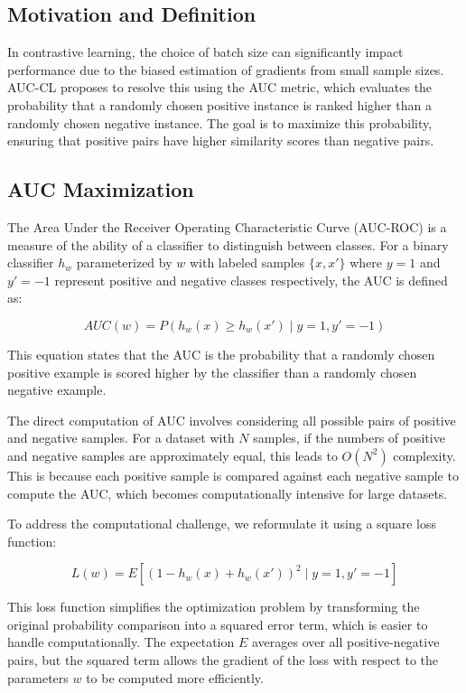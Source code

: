 \subsection{Motivation and Definition}
In contrastive learning, the choice of batch size can significantly impact performance due to the biased estimation of gradients from small sample sizes. AUC-CL proposes to resolve this using the AUC metric, which evaluates the probability that a randomly chosen positive instance is ranked higher than a randomly chosen negative instance. The goal is to maximize this probability, ensuring that positive pairs have higher similarity scores than negative pairs.

\subsection{AUC Maximization}
The Area Under the Receiver Operating Characteristic Curve (AUC-ROC) is a measure of the ability of a classifier to distinguish between classes. For a binary classifier \( h_w \) parameterized by \( w \) with labeled samples \( \{x, x'\} \) where \( y = 1 \) and \( y' = -1 \) represent positive and negative classes respectively, the AUC is defined as:

\[
AUC(w) = P(h_w(x) \geq h_w(x') \mid y = 1, y' = -1)
\]

This equation states that the AUC is the probability that a randomly chosen positive example is scored higher by the classifier than a randomly chosen negative example.

The direct computation of AUC involves considering all possible pairs of positive and negative samples. For a dataset with \( N \) samples, if the numbers of positive and negative samples are approximately equal, this leads to \( O(N^2) \) complexity. This is because each positive sample is compared against each negative sample to compute the AUC, which becomes computationally intensive for large datasets.

To address the computational challenge, we reformulate it using a square loss function:

\[
L(w) = E\left[(1 - h_w(x) + h_w(x'))^2 \mid y = 1, y' = -1\right]
\]

This loss function simplifies the optimization problem by transforming the original probability comparison into a squared error term, which is easier to handle computationally. The expectation \( E \) averages over all positive-negative pairs, but the squared term allows the gradient of the loss with respect to the parameters \( w \) to be computed more efficiently. 

